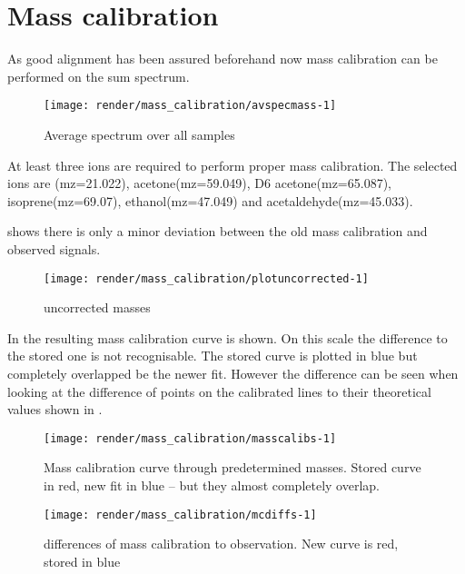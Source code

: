 \section{Mass calibration}

As good alignment has been assured beforehand now mass calibration can be performed on the sum spectrum.





\begin{figure}
\texttt{[image: render/mass\_calibration/avspecmass-1]} \caption[Average spectrum over all samples]{Average spectrum over all samples}\label{fig:avspecmass}
\end{figure}






At least three ions are required to perform proper mass calibration.  The
selected ions are (mz=\num{21.022}),
acetone(mz=\num{59.049}), D6
acetone(mz=\num{65.087}),
isoprene(mz=\num{69.07}),
ethanol(mz=\num{47.049}) and
acetaldehyde(mz=\num{45.033}).


 shows there is only a minor deviation between the old mass calibration and observed signals.

\begin{figure}
\texttt{[image: render/mass\_calibration/plotuncorrected-1]} \caption[uncorrected masses]{uncorrected masses}\label{fig:plotuncorrected}
\end{figure}





In  the resulting mass calibration curve is shown.
On this scale the difference to the stored one is not recognisable.  The
stored curve is plotted in blue but completely overlapped be the newer fit.
However the difference can be seen when looking at the difference of points
on the calibrated lines to their theoretical values shown in .

\begin{figure}
\texttt{[image: render/mass\_calibration/masscalibs-1]} \caption[Mass calibration curve through predetermined masses]{Mass calibration curve through predetermined masses.  Stored curve in red, new fit in blue -- but they almost completely overlap.}\label{fig:masscalibs}
\end{figure}



\begin{figure}
\texttt{[image: render/mass\_calibration/mcdiffs-1]} \caption[differences of mass calibration to observation]{differences of mass calibration to observation. New curve is red, stored in blue}\label{fig:mcdiffs}
\end{figure}



